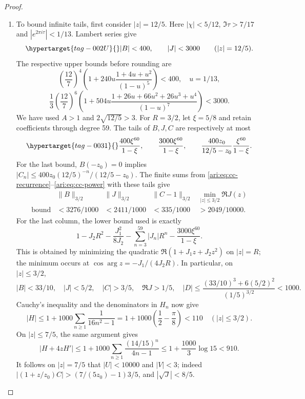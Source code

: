 \begin{proof}
\begin{enumerate}[label=\arabic*.,leftmargin=*]
\item To bound infinite tails, first consider $|z|=12/5$.
Here $|\chi|<5/12$, $\Im\tau>7/17$ and
$|e^{2\pi i\tau}|<1/13$. Lambert series give
\begin{equation}\hypertarget{tag-002U}{}\label{ari:eq:cc-outer}
 |B|<400,\qquad |J|<3000\qquad (|z|=12/5).
\end{equation}
The respective upper bounds before rounding are
\[
 \left(\frac{12}{7}\right)^4
 \left(1+240u\frac{1+4u+u^2}{(1-u)^5}\right)<400,
 \quad u=1/13,
\]
\[
 \frac13\left(\frac{12}{7}\right)^6
 \left(1+504u\frac{1+26u+66u^2+26u^3+u^4}{(1-u)^7}\right)<3000.
\]
We have used $A>1$ and $2\sqrt{12/5}>3$.
For $R=3/2$, let $\xi=5/8$ and retain coefficients through
degree 59. The tails of $B,J,C$ are respectively at most
\begin{equation}\hypertarget{tag-0031}{}\label{ari:eq:cc-tail60}
 \frac{400\xi^{60}}{1-\xi},\qquad
 \frac{3000\xi^{60}}{1-\xi},\qquad
 \frac{400z_0}{12/5-z_0}\frac{\xi^{60}}{1-\xi}.
\end{equation}
For the last bound, $B(-z_0)=0$ implies
$|C_n|\le400z_0(12/5)^{-n}/(12/5-z_0)$.
The finite sums from \eqref{ari:eq:cc-recurrence}--\eqref{ari:eq:cc-power}
with these tails give
\[
 \begin{array}{c|cccc}
 &\|B\|_{3/2}&\|J\|_{3/2}&\|C-1\|_{3/2}
                   &\min_{|z|\le3/2}\Re J(z)\\ \hline
 \text{bound}&<3276/1000&<2411/1000&<335/1000&>2049/10000.
 \end{array}
\]
For the last column, the lower bound used is exactly
\[
 1-J_2R^2-\frac{J_1^2}{8J_2}
       -\sum_{n=3}^{59}|J_n|R^n-
                   \frac{3000\xi^{60}}{1-\xi}.
\]
This is obtained by minimizing the quadratic
$\Re(1+J_1z+J_2z^2)$ on $|z|=R$; the minimum occurs at
$\cos\arg z=-J_1/(4J_2R)$. In particular, on $|z|\le3/2$,
\[
 |B|<33/10,\quad |J|<5/2,\quad |C|>3/5,\quad
 \Re J>1/5,\quad
 |D|\le\frac{(33/10)^3+6(5/2)^2}{(1/5)^{3/2}}<1000.
\]
Cauchy's inequality and the denominators in $H_n$ now give
\[
 |H|\le1+1000\sum_{n\ge1}\frac1{16n^2-1}
       =1+1000\left(\frac12-\frac\pi8\right)<110
                      \quad (|z|\le3/2).
\]
On $|z|\le7/5$, the same argument gives
\[
 |H+4zH'|\le1+1000\sum_{n\ge1}
                 \frac{(14/15)^n}{4n-1}
       \le1+\frac{1000}{3}\log15<910.
\]
It follows on $|z|=7/5$ that $|U|<10000$ and $|V|<3$;
indeed $|(1+z/z_0)C|>(7/(5z_0)-1)3/5$, and
$|\sqrt J|<8/5$.


\end{enumerate}
\end{proof}
